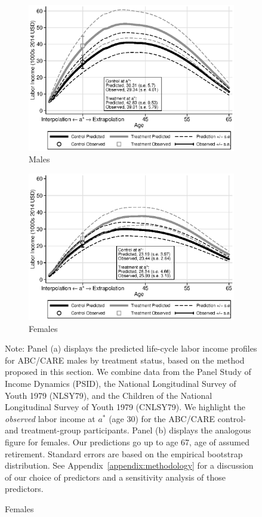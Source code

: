 \begin{figure}
\centering
\caption{Predicted Labor Income Profiles for ABC/CARE Participants}\label{fig:labor-income-profiles}
\begin{subfigure}[h]{0.5\textwidth}
		\centering
		\caption{Males} \label{fig:labor-income-profilesc}
		\includegraphics[width=\textwidth]{output/labor_25-65_pset1_mset3_male.eps}
\end{subfigure}%
\begin{subfigure}[h]{0.5\textwidth}
		\centering
		\caption{Females} \label{fig:labor-income-profilesa}
		\includegraphics[width=\textwidth]{output/labor_25-65_pset1_mset3_female.eps}
\end{subfigure}
\footnotesize \justify
Note: Panel (a) displays the predicted life-cycle labor income profiles for ABC/CARE males by treatment status, based on the method proposed in this section. We combine data from the Panel Study of Income Dynamics (PSID), the National Longitudinal Survey of Youth 1979 (NLSY79), and the Children of the National Longitudinal Survey of Youth 1979 (CNLSY79). We highlight the \textit{observed} labor income at $a^*$ (age 30) for the ABC/CARE control- and treatment-group participants. Panel (b) displays the analogous figure for females. Our predictions go up to age 67, age of assumed retirement. Standard errors are based on the empirical bootstrap distribution. See Appendix~\ref{appendix:methodology} for a discussion of our choice of predictors and a sensitivity analysis of those predictors.

\end{figure}

